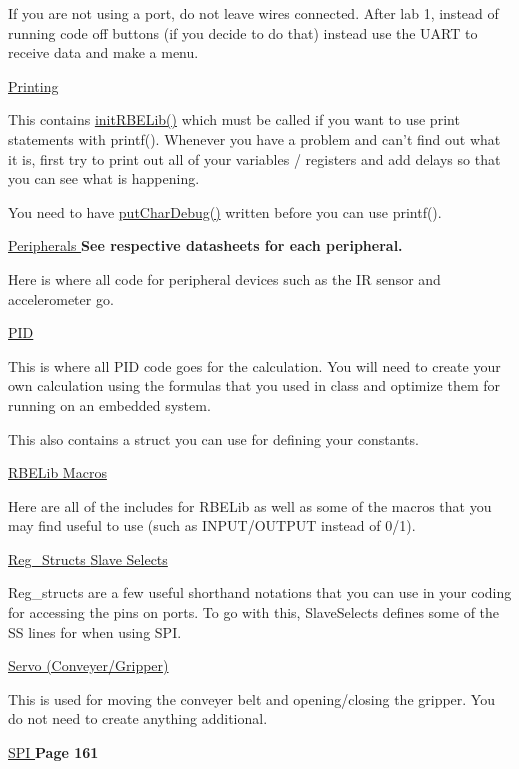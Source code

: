 If you are not using a port, do not leave wires connected. After lab 1, instead of running code off buttons (if you decide to do that) instead use the U\-A\-R\-T to receive data and make a menu. 

 \hyperlink{_debug_8h}{Printing }

This contains \hyperlink{_debug_8h_af447ccfe0edd5c2eee6ff9aba36bd6f9}{init\-R\-B\-E\-Lib()} which must be called if you want to use print statements with printf(). Whenever you have a problem and can't find out what it is, first try to print out all of your variables / registers and add delays so that you can see what is happening.

You need to have \hyperlink{_u_s_a_r_t_debug_8h_ab52220b9802762326175f5a6d09c50a1}{put\-Char\-Debug()} written before you can use printf(). 

 \hyperlink{_periph_8h}{Peripherals } {\bfseries  See respective datasheets for each peripheral.}

Here is where all code for peripheral devices such as the I\-R sensor and accelerometer go. 

 \hyperlink{_p_i_d_8h}{P\-I\-D }

This is where all P\-I\-D code goes for the calculation. You will need to create your own calculation using the formulas that you used in class and optimize them for running on an embedded system.

This also contains a struct you can use for defining your constants. 

 \hyperlink{_r_b_e_lib_8h}{R\-B\-E\-Lib Macros }

Here are all of the includes for R\-B\-E\-Lib as well as some of the macros that you may find useful to use (such as I\-N\-P\-U\-T/\-O\-U\-T\-P\-U\-T instead of 0/1). 

 \hyperlink{reg__structs_8h}{Reg\-\_\-\-Structs } \hyperlink{_slave_selects_8h}{Slave Selects }

Reg\-\_\-structs are a few useful shorthand notations that you can use in your coding for accessing the pins on ports. To go with this, Slave\-Selects defines some of the S\-S lines for when using S\-P\-I. 

 \hyperlink{_set_servo_8h}{Servo (Conveyer/\-Gripper) }

This is used for moving the conveyer belt and opening/closing the gripper. You do not need to create anything additional. 

 \hyperlink{_s_p_i_8h}{S\-P\-I } {\bfseries  Page 161 }

